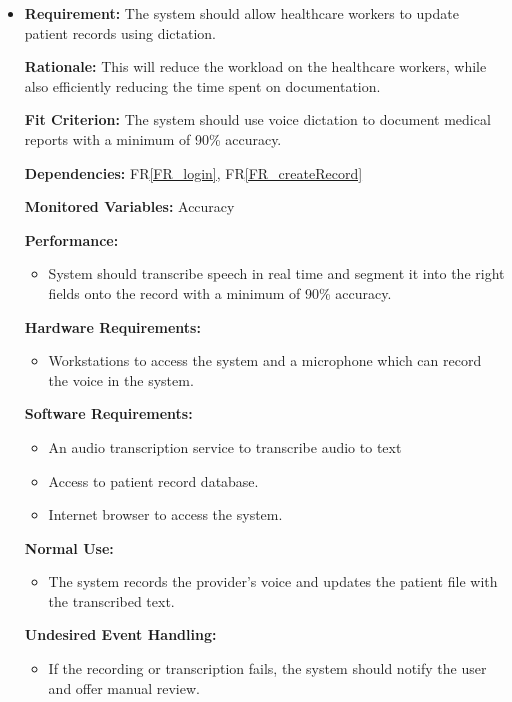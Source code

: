 \documentclass[12pt]{article}
\newcounter{reqnum} %
\begin{document}
\begin{itemize}
\item[FR\refstepcounter{reqnum}\thereqnum \label{FR_DictationRecording}:]

\textbf{Requirement:} The system should allow healthcare workers to update patient records using dictation. 
    
\textbf{Rationale:} This will reduce the workload on the healthcare workers, while also efficiently reducing the time spent on documentation. 
    
\textbf{Fit Criterion:} The system should use voice dictation to document medical reports with a minimum of 90\% accuracy. 
    
\textbf{Dependencies:} FR\ref{FR_login}, FR\ref{FR_createRecord} 
    
\textbf{Monitored Variables:} Accuracy
    
\textbf{Performance:} 
  \begin{itemize}
      \item System should transcribe speech in real time and segment it into the right fields onto the record with a minimum of 90\% accuracy.
  \end{itemize}
    
\textbf{Hardware Requirements:}
  \begin{itemize}
      \item Workstations to access the system and a microphone which can record the voice in the system. 
  \end{itemize}
    
\textbf{Software Requirements:}
  \begin{itemize}
      \item An audio transcription service to transcribe audio to text 
      \item Access to patient record database. 
      \item Internet browser to access the system.  
  \end{itemize}
    
\textbf{Normal Use:} 
\begin{itemize}
  \item The system records the provider's voice and updates the patient file with the transcribed text.
\end{itemize}
    
\textbf{Undesired Event Handling:} 
\begin{itemize}
  \item If the recording or transcription fails, the system should notify the user and offer manual review.
\end{itemize}



\end{itemize}
\end{document}
